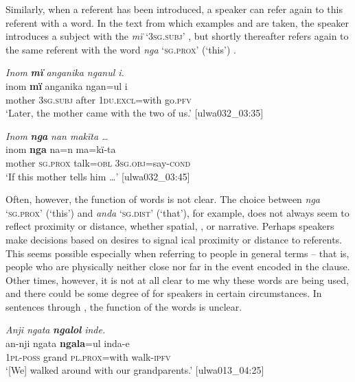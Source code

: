 


Similarly, when a referent has been introduced, a speaker can refer again to this referent with a  word. In the text from which examples  and  are taken, the speaker introduces a subject with the  \textit{mï} ‘3\textsc{sg.subj’} , but shortly thereafter refers again to the same referent with the  word \textit{nga} ‘\textsc{sg.prox}’ (‘this’) .

\ea%
    \label{ex:det:111}
          \textit{Inom} \textbf{\textit{mï}} \textit{anganika nganul i.}\\
\gll    inom  \textbf{mï}      anganika  ngan=ul      i\\
    mother  3\textsc{sg.subj}  after    \textsc{1du.excl}=with  go.\textsc{pfv}\\
\glt `Later, the mother came with the two of us.’ [ulwa032\_03:35]
\z

\ea%
    \label{ex:det:112}
          \textit{Inom} \textbf{\textit{nga}} \textit{nan makïta …}\\
\gll    inom  \textbf{nga}    na=n    ma=kï-ta\\
    mother  \textsc{sg.prox}  talk=\textsc{obl}  3\textsc{sg.obj}=say-\textsc{cond}\\
\glt `If this mother tells him …’ [ulwa032\_03:45]
\z

Often, however, the  function of  words is not clear. The choice between \textit{nga} ‘\textsc{sg.prox}’ (‘this’) and \textit{anda} ‘\textsc{sg.dist}’ (‘that’), for example, does not always seem to reflect proximity or distance, whether spatial, , or narrative. Perhaps speakers make decisions based on desires to signal ical proximity or distance to referents. This seems possible especially when referring to people in general terms -- that is, people who are physically neither close nor far in the event encoded in the clause. Other times, however, it is not at all clear to me why these words are being used, and there could be some degree of  for speakers in certain circumstances. In sentences  through , the  function of the  words is unclear.

\ea%
    \label{ex:det:113}
          \textit{Anji ngata} \textbf{\textit{ngalol}} \textit{inde.}\\
\gll    an-nji    ngata  \textbf{ngala}=ul    inda-e\\
    1\textsc{pl-poss}  grand  \textsc{pl.prox}=with  walk-\textsc{ipfv}\\
\glt `[We] walked around with our grandparents.’ [ulwa013\_04:25]
\z

